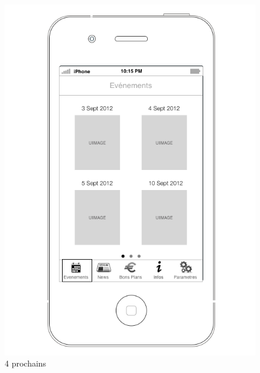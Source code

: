 \documentclass[a4paper, 11pt]{article}
\begin{document}
\begin{figure}[htbp]
\begin{minipage}[c]{.33\linewidth}
	\end{minipage}
	\begin{minipage}[c]{.32\linewidth}
		\begin{center}
			\includegraphics[scale=0.28]{../../Sketch/iOS/evenements_4_prochains.png}
		\end{center}
	\caption{4 prochains}
	\label{4_prochains}

	\end{minipage}
\end{figure}
\end{document}
